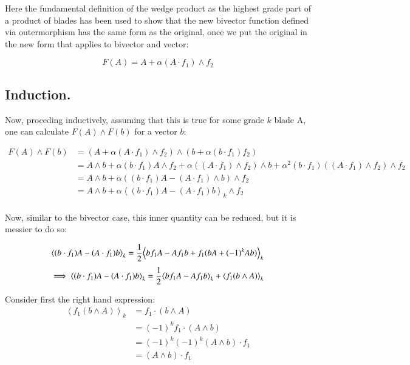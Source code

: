 \documentclass{article}
\newcommand{\gpgrade}[2] {{\left\langle{{#1}}\right\rangle}_{#2}}
\begin{document}
Here the fundamental definition of the wedge product as the 
highest grade part of a product of blades has been used to show that the new
bivector function defined via outermorphism has the same form as the original, once we put the original in the new form that applies to bivector and vector:

\begin{equation}
F(A) = A + \alpha(A \cdot f_1) \wedge f_2 
\end{equation}

\subsection{ Induction. }

Now, proceding inductively, assuming that this is true for some grade $k$ blade A, one can calculate $F(A) \wedge F(b)$ for a vector $b$:

\begin{align*}
F(A) \wedge F(b)
&= (A + \alpha(A \cdot f_1) \wedge f_2) \wedge (b + \alpha(b \cdot f_1) f_2 ) \\
&= A \wedge b 
+ \alpha( b \cdot f_1 ) A \wedge f_2 
+ \alpha (( A \cdot f_1) \wedge f_2) \wedge b
+ \alpha^2 (b \cdot f_1) ((A \cdot f_1) \wedge f_2) \wedge f_2 \\
&= A \wedge b + \alpha \left( ( b \cdot f_1 ) A - ( A \cdot f_1) \wedge b \right) \wedge f_2 \\
&= A \wedge b + \alpha \gpgrade{ ( b \cdot f_1 ) A - ( A \cdot f_1) b}{k} \wedge f_2 \\
\end{align*}

Now, similar to the bivector case, this inner quantity can be reduced, but it is messier to do so:

\begin{align*}
\gpgrade{ ( b \cdot f_1 ) A - ( A \cdot f_1) b}{k}
&= \inv{2} \gpgrade{ b f_1 A - A f_1 b + f_1 (b A + (-1)^{k} A b) }{k} \\
\end{align*}
\begin{equation} \label{eqn:r1}
\implies
\gpgrade{ ( b \cdot f_1 ) A - ( A \cdot f_1) b}{k} = \inv{2} \gpgrade{ b f_1 A - A f_1 b}{k} + \gpgrade{ f_1 (b \wedge A) }{k}
\end{equation}

Consider first the right hand expression:
\begin{align*}
\gpgrade{ f_1 (b \wedge A) }{k} 
&= f_1 \cdot (b \wedge A) \\
&= (-1)^{k} f_1 \cdot (A \wedge b) \\
&= (-1)^{k} (-1)^k (A \wedge b) \cdot f_1 \\
&= (A \wedge b) \cdot f_1 \\
\end{align*}
\end{document}
